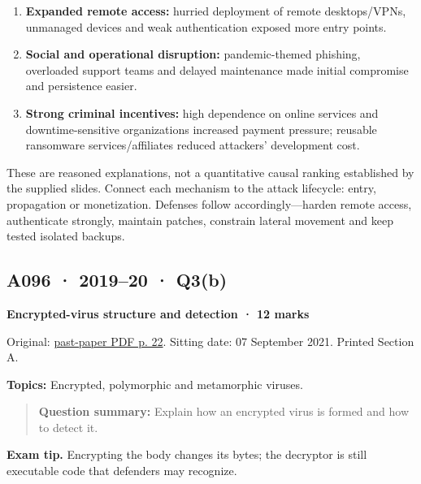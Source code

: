 \documentclass[11pt,a4paper]{article}
\begin{document}
\begin{enumerate}

\item \textbf{Expanded remote access:} hurried deployment of remote desktops/\allowbreak{}VPNs,\allowbreak{} unmanaged devices and weak authentication exposed more entry points.

\item \textbf{Social and operational disruption:} pandemic-themed phishing,\allowbreak{} overloaded support teams and delayed maintenance made initial compromise and persistence easier.

\item \textbf{Strong criminal incentives:} high dependence on online services and downtime-sensitive organizations increased payment pressure; reusable ransomware services/\allowbreak{}affiliates reduced attackers' development cost.

\end{enumerate}

These are reasoned explanations,\allowbreak{} not a quantitative causal ranking established by the supplied slides. Connect each mechanism to the attack lifecycle: entry,\allowbreak{} propagation or monetization. Defenses follow accordingly—harden remote access,\allowbreak{} authenticate strongly,\allowbreak{} maintain patches,\allowbreak{} constrain lateral movement and keep tested isolated backups.




\clearpage
\subsection{A096 · 2019–20 · Q3(b)}\label{a096}

\textbf{Encrypted-virus structure and detection · 12 marks}


Original: \href{../../CSE405-Security_Merged.pdf\#page=22}{past-paper PDF p. 22}. Sitting date: 07 September 2021. Printed Section A.


\textbf{Topics:} Encrypted,\allowbreak{} polymorphic and metamorphic viruses.



\begin{quote}\small

\textbf{Question summary:} Explain how an encrypted virus is formed and how to detect it.



\end{quote}


{\color{ForestGreen}\textbf{Exam tip.} Encrypting the body changes its bytes; the decryptor is still executable code that defenders may recognize.}
\end{document}
